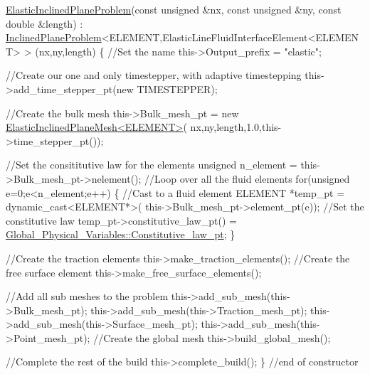 \begin{DoxyCodeInclude}
 \hyperlink{classElasticInclinedPlaneProblem}{ElasticInclinedPlaneProblem}(\textcolor{keyword}{const} \textcolor{keywordtype}{unsigned} &nx, \textcolor{keyword}{const} \textcolor{keywordtype}{unsigned} &ny,
                      \textcolor{keyword}{const} \textcolor{keywordtype}{double} &length) :
  \hyperlink{classInclinedPlaneProblem}{InclinedPlaneProblem}<ELEMENT,ElasticLineFluidInterfaceElement<ELEMENT> >
  (nx,ny,length) 
  \{
   \textcolor{comment}{//Set the name}
   this->Output\_prefix = \textcolor{stringliteral}{"elastic"};
   
   \textcolor{comment}{//Create our one and only timestepper, with adaptive timestepping}
   this->add\_time\_stepper\_pt(\textcolor{keyword}{new} TIMESTEPPER);

   \textcolor{comment}{//Create the bulk mesh}
   this->Bulk\_mesh\_pt = \textcolor{keyword}{new}  \hyperlink{classElasticInclinedPlaneMesh}{ElasticInclinedPlaneMesh<ELEMENT>}(
    nx,ny,length,1.0,this->time\_stepper\_pt());

   \textcolor{comment}{//Set the consititutive law for the elements}
   \textcolor{keywordtype}{unsigned} n\_element = this->Bulk\_mesh\_pt->nelement();
   \textcolor{comment}{//Loop over all the fluid elements }
   \textcolor{keywordflow}{for}(\textcolor{keywordtype}{unsigned} e=0;e<n\_element;e++)
    \{
     \textcolor{comment}{//Cast to a fluid element}
     ELEMENT *temp\_pt = \textcolor{keyword}{dynamic\_cast<}ELEMENT*\textcolor{keyword}{>}(
      this->Bulk\_mesh\_pt->element\_pt(e));
     \textcolor{comment}{//Set the constitutive law }
     temp\_pt->constitutive\_law\_pt() = 
      \hyperlink{namespaceGlobal__Physical__Variables_a2a37fb040c832ee7a086bb13bb02a100}{Global\_Physical\_Variables::Constitutive\_law\_pt};
    \}
   
   \textcolor{comment}{//Create the traction elements}
   this->make\_traction\_elements();
   \textcolor{comment}{//Create the free surface element}
   this->make\_free\_surface\_elements();

   \textcolor{comment}{//Add all sub meshes to the problem}
   this->add\_sub\_mesh(this->Bulk\_mesh\_pt);
   this->add\_sub\_mesh(this->Traction\_mesh\_pt);
   this->add\_sub\_mesh(this->Surface\_mesh\_pt);
   this->add\_sub\_mesh(this->Point\_mesh\_pt);
   \textcolor{comment}{//Create the global mesh}
   this->build\_global\_mesh();

   \textcolor{comment}{//Complete the rest of the build}
   this->complete\_build();
  \} \textcolor{comment}{//end of constructor}

\end{DoxyCodeInclude}


